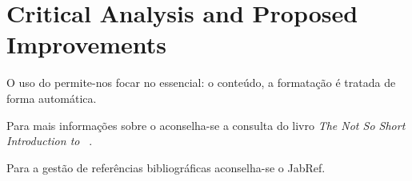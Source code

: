 

\chapter{Critical Analysis and Proposed Improvements}
\label{ch:conclusoes}


O uso do \LaTeXe permite-nos focar no essencial: o conteúdo, a formatação é tratada de forma automática.

Para mais informações sobre o \LaTeXe aconselha-se a consulta do
livro \emph{The Not So Short Introduction to \LaTeXe}~\cite{oetiker2000nss}.

Para a gestão de referências bibliográficas aconselha-se o JabRef. %
